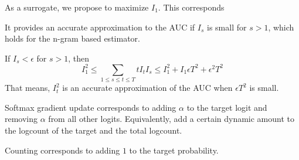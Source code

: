 As a surrogate, we propose to maximize $I_1$.
This corresponds

It provides an accurate approximation to the AUC if $I_s$ is small for $s > 1$, which holds for the n-gram based estimator.

If $I_s < \epsilon$ for $s > 1$, then 
\begin{equation}
	I_1^2 \leq \sum_{1\leq s \leq t \leq T}  tI_t I_s \leq I_1^2 + I_1 \epsilon T^2 + \epsilon^2 T^2
\end{equation}
That means, $I_t^2$ is an accurate approximation of the AUC when $\epsilon T^2$ is small.


Softmax gradient update corresponds to adding $\alpha$ to the target logit and removing $\alpha$ from all other logits.
Equivalently, add a certain dynamic amount to the logcount of the target and the total logcount.



Counting corresponds to adding $1$ to the target probability. 

